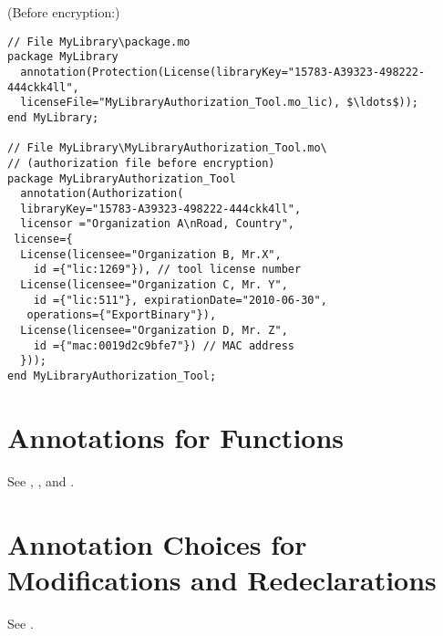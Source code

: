 \begin{example}
(Before encryption:)
\begin{lstlisting}[language=modelica]
// File MyLibrary\package.mo
package MyLibrary
  annotation(Protection(License(libraryKey="15783-A39323-498222-444ckk4ll",
  licenseFile="MyLibraryAuthorization_Tool.mo_lic), $\ldots$));
end MyLibrary;

// File MyLibrary\MyLibraryAuthorization_Tool.mo\
// (authorization file before encryption)
package MyLibraryAuthorization_Tool
  annotation(Authorization(
  libraryKey="15783-A39323-498222-444ckk4ll",
  licensor ="Organization A\nRoad, Country",
 license={
  License(licensee="Organization B, Mr.X",
    id ={"lic:1269"}), // tool license number
  License(licensee="Organization C, Mr. Y",
    id ={"lic:511"}, expirationDate="2010-06-30",
   operations={"ExportBinary"}),
  License(licensee="Organization D, Mr. Z",
    id ={"mac:0019d2c9bfe7"}) // MAC address
  }));
end MyLibraryAuthorization_Tool;
\end{lstlisting}
\end{example}


\section{Annotations for Functions}\label{annotations-for-functions}

See , , and .


\section{Annotation Choices for Modifications and Redeclarations}\label{annotation-choices-for-modifications-and-redeclarations}

See .

